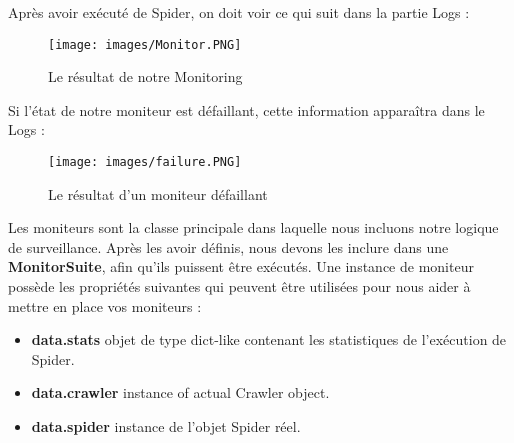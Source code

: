 \vspace{1cm}   
\newpage
\noindent Après avoir exécuté de Spider, on doit voir ce qui suit dans la partie Logs :
\begin{figure}[H]
            \centering
            \texttt{[image: images/Monitor.PNG]}
            \caption{Le résultat de notre Monitoring}
            \label{fig:Logs}  
        \end{figure}
\noindent Si l'état de notre moniteur est défaillant, cette information apparaîtra dans le Logs :
\begin{figure}[H]
            \centering
            \texttt{[image: images/failure.PNG]}
            \caption{Le résultat d'un moniteur défaillant}
            \label{fig:Logs}  
        \end{figure}
Les moniteurs sont la classe principale dans laquelle nous incluons notre logique de surveillance. Après les avoir définis, nous devons les inclure dans une \textbf{MonitorSuite}, afin qu'ils puissent être exécutés. Une instance de moniteur possède les propriétés suivantes qui peuvent être utilisées pour nous aider à mettre en place vos moniteurs :
\begin{itemize}
    \item\textbf{data.stats}  objet de type dict-like contenant les statistiques de l'exécution de Spider.
    \item\textbf{data.crawler} instance of actual Crawler object.
    \item\textbf{data.spider} instance de l'objet Spider réel.
\end{itemize}
